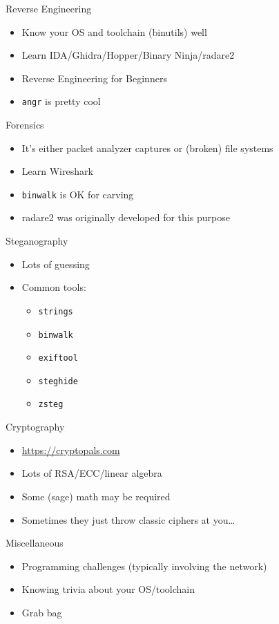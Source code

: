 \documentclass[presentation]{beamer}
\begin{document}
\begin{frame}[fragile,label={sec:orgbae5dfc}]{Reverse Engineering}
 \begin{itemize}
\item Know your OS and toolchain (binutils) well
\item Learn IDA/Ghidra/Hopper/Binary Ninja/radare2
\item{} Reverse Engineering for Beginners
\item \texttt{angr} is pretty cool
\end{itemize}
\end{frame}

\begin{frame}[fragile,label={sec:org0b0113b}]{Forensics}
 \begin{itemize}
\item It's either packet analyzer captures or (broken) file systems
\item Learn Wireshark
\item \texttt{binwalk} is OK for carving
\item radare2 was originally developed for this purpose
\end{itemize}
\end{frame}

\begin{frame}[fragile,label={sec:org1bb3ec7}]{Steganography}
 \begin{itemize}
\item Lots of guessing
\item Common tools:
\begin{itemize}
\item \texttt{strings}
\item \texttt{binwalk}
\item \texttt{exiftool}
\item \texttt{steghide}
\item \texttt{zsteg}
\end{itemize}
\end{itemize}
\end{frame}

\begin{frame}[label={sec:orge7aa7ad}]{Cryptography}
\begin{itemize}
\item \url{https://cryptopals.com}
\item Lots of RSA/ECC/linear algebra
\item Some (sage) math may be required
\item Sometimes they just throw classic ciphers at you\ldots{}
\end{itemize}
\end{frame}

\begin{frame}[label={sec:orgead0c51}]{Miscellaneous}
\begin{itemize}
\item Programming challenges (typically involving the network)
\item Knowing trivia about your OS/toolchain
\item Grab bag
\end{itemize}
\end{frame}
\end{document}
